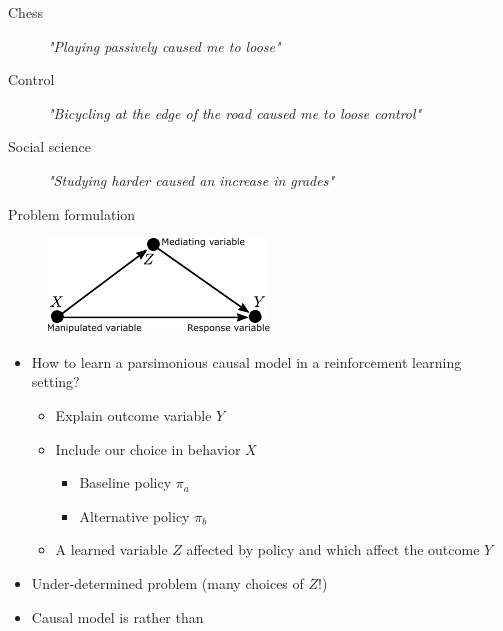 \begin{frame}%
\begin{description}%
\item[Chess] \emph{"Playing passively caused me to loose"} \pause \pause
\item[Control] \emph{"Bicycling at the edge of the road caused me to loose control"} \pause 
\item[Social science] \emph{"Studying harder caused an increase in grades"} \pause
\end{description}
\end{frame}
\begin{frame}{Problem formulation}%
\begin{figure}
\centering
\includegraphics[width=1.0\linewidth]{causal_figures/medanal1}
\end{figure}

\begin{itemize}
\item How to learn a parsimonious causal model in a reinforcement learning setting? \pause
\begin{itemize} 
\item Explain outcome variable $Y$ \pause
\item Include our choice in behavior $X$  \pause
\begin{itemize}
	\item Baseline policy $\pi_a$ 
	\item Alternative policy $\pi_b$
\end{itemize}
\item A learned variable $Z$ affected by policy and which affect the outcome $Y$ \pause
\end{itemize}
\item Under-determined problem (many choices of $Z$!) \pause
\item Causal model is  rather than  
\end{itemize}
\end{frame}

